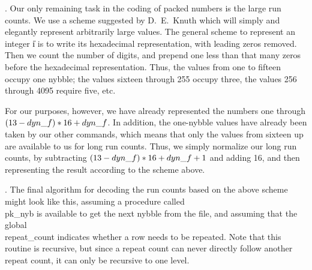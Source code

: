 \fi

. Our only remaining task in the coding of packed numbers is the large run
counts.  We use a scheme suggested by D.~E.~Knuth
which will simply and elegantly represent arbitrarily large values.  The
general scheme to represent an integer \|i is to write its hexadecimal
representation, with leading zeros removed.  Then we count the number of
digits, and prepend one less than that many zeros before the hexadecimal
representation.  Thus, the values from one to fifteen occupy one nybble;
the values sixteen through 255 occupy three, the values 256 through 4095
require five, etc.

For our purposes, however, we have already represented the numbers one
through $(13-\\{dyn\_f})\ast16+\\{dyn\_f}$.  In addition, the one-nybble values
have
already been taken by our other commands, which means that only the values
from sixteen up are available to us for long run counts.  Thus, we simply
normalize our long run counts, by subtracting $(13-\\{dyn\_f})\ast16+\\{dyn%
\_f}+1$ and
adding 16, and then representing the result according to the scheme above.

\fi

. The final algorithm for decoding the run counts based on the above scheme
might look like this, assuming a procedure called \\{pk\_nyb} is available
to get the next nybble from the file, and assuming that the global
\\{repeat\_count} indicates whether a row needs to be repeated.  Note that this
routine is recursive, but since a repeat count can never directly follow
another repeat count, it can only be recursive to one level.

